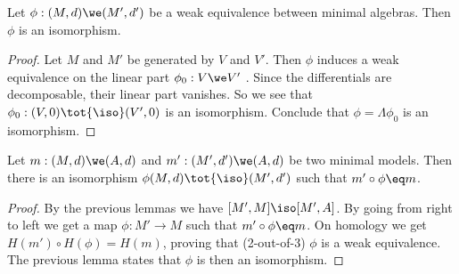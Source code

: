 \begin{lemma}
	Let $\phi: (M, d) \we (M', d')$ be a weak equivalence between minimal algebras. Then $\phi$ is an isomorphism.
\end{lemma}
\begin{proof}
	Let $M$ and $M'$ be generated by $V$ and $V'$. Then $\phi$ induces a weak equivalence on the linear part $\phi_0: V \we V'$ \cite[Theorem 1.5.2]{loday}. Since the differentials are decomposable, their linear part vanishes. So we see that $\phi_0: (V, 0) \tot{\iso} (V', 0)$ is an isomorphism.
	Conclude that $\phi = \Lambda \phi_0$ is an isomorphism.
\end{proof}

\begin{theorem}
	Let $m: (M, d) \we (A, d)$ and $m': (M', d') \we (A, d)$ be two minimal models. Then there is an isomorphism $\phi (M, d) \tot{\iso} (M', d')$ such that $m' \circ \phi \eq m$.
\end{theorem}
\begin{proof}
	By the previous lemmas we have $[M', M] \iso [M', A]$. By going from right to left we get a map $\phi: M' \to M$ such that $m' \circ \phi \eq m$. On homology we get $H(m') \circ H(\phi) = H(m)$, proving that (2-out-of-3) $\phi$ is a weak equivalence. The previous lemma states that $\phi$ is then an isomorphism.
\end{proof}
